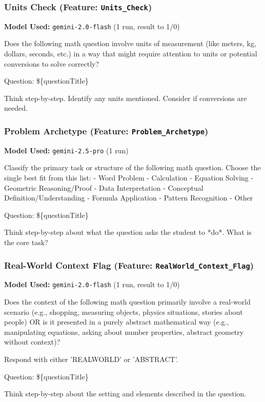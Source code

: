 \documentclass[
    a4paper, %
    10pt, %
    twoside, %
]{LTJournalArticle}
\begin{document}
\subsubsection{Units Check (Feature: \texttt{Units\_Check})}
\label{app:prompt_units_check}
\textbf{Model Used:} \texttt{gemini-2.0-flash} (1 run, result to 1/0)
\begin{promptbox}
Does the following math question involve units of measurement (like meters, kg, dollars, seconds, etc.) in a way that might require attention to units or potential conversions to solve correctly?

Question:
\$\{questionTitle\}

Think step-by-step. Identify any units mentioned. Consider if conversions are needed.
\end{promptbox}

\subsubsection{Problem Archetype (Feature: \texttt{Problem\_Archetype})}
\label{app:prompt_problem_archetype}
\textbf{Model Used:} \texttt{gemini-2.5-pro} (1 run)
\begin{promptbox}
Classify the primary task or structure of the following math question. Choose the single best fit from this list:
- Word Problem - Calculation
- Equation Solving
- Geometric Reasoning/Proof
- Data Interpretation
- Conceptual Definition/Understanding
- Formula Application
- Pattern Recognition
- Other

Question:
\$\{questionTitle\}

Think step-by-step about what the question asks the student to *do*. What is the core task?
\end{promptbox}

\subsubsection{Real-World Context Flag (Feature: \texttt{RealWorld\_Context\_Flag})}
\label{app:prompt_realworld_flag}
\textbf{Model Used:} \texttt{gemini-2.0-flash} (1 run, result to 1/0)
\begin{promptbox}
Does the context of the following math question primarily involve a real-world scenario (e.g., shopping, measuring objects, physics situations, stories about people) OR is it presented in a purely abstract mathematical way (e.g., manipulating equations, asking about number properties, abstract geometry without context)?

Respond with either 'REALWORLD' or 'ABSTRACT'.

Question:
\$\{questionTitle\}

Think step-by-step about the setting and elements described in the question.
\end{promptbox}
\end{document}
